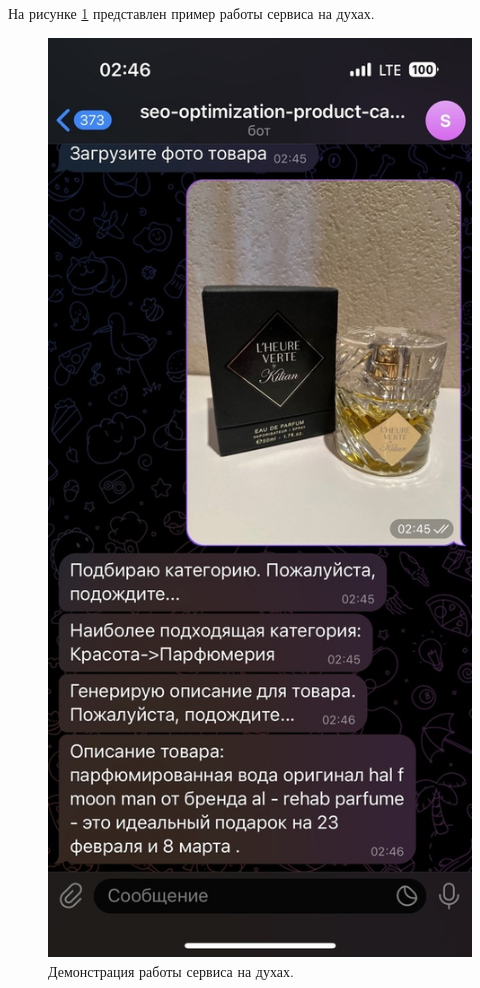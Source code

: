 \documentclass[a4paper,12pt]{extarticle}
\begin{document}
\newpage

На рисунке \ref{fig:telegram-parf-description} представлен пример работы сервиса на духах.

\begin{figure}[ht]
	\centering
	\includegraphics[scale=0.35]{telegram-parf-description.png}
	\caption{Демонстрация работы сервиса на духах.}
	\label{fig:telegram-parf-description}
\end{figure}
\end{document}
